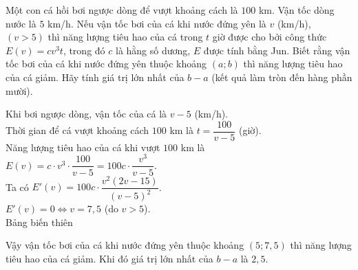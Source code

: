 \begin{ex}%
Một con cá hồi bơi ngược dòng để vượt khoảng cách là $100$ km. Vận tốc dòng nước là $5$ km/h. Nếu vận tốc bơi của cá khi nước đứng yên là $v$ (km/h), $\left(v >5 \right)$ thì năng lượng tiêu hao của cá trong $t$ giờ được cho bởi công thức $E \left(v \right)= c v^3 t $, trong đó $c$ là hằng số dương, $E$ được tính bằng Jun. Biết rằng vận tốc bơi của cá khi nước đứng yên thuộc khoảng $\left(a; b \right)$ thì năng lượng tiêu hao của cá giảm. Hãy tính giá trị lớn nhất của $b-a$ (kết quả làm tròn đến hàng phần mười). 
\loigiai
{
Khi bơi ngược dòng, vận tốc của cá là $v-5$ (km/h). \\
Thời gian để cá vượt khoảng cách $100$ km là $t = \dfrac{100}{v-5}$ (giờ). \\
Năng lượng tiêu hao của cá khi vượt $100$ km là $E (v) = c \cdot v^3 \cdot \dfrac{100}{v-5} = 100 c \cdot \dfrac{v^3}{v-5}$. \\
Ta có $E' \left(v \right) = 100 c \cdot \dfrac{v^2 \left(2v -15 \right)}{\left(v-5 \right)^2}$. \\
$E' \left(v \right) =0 \Leftrightarrow v = 7{,}5$ (do $v >5$). \\ 
Bảng biến thiên 
\begin{center}
\end{center}
Vậy vận tốc bơi của cá khi nước đứng yên thuộc khoảng $\left(5; 7{,}5\right)$ thì năng lượng tiêu hao của cá giảm. Khi đó giá trị lớn nhất của $b-a$ là $2{,}5$. 
}
\end{ex}

